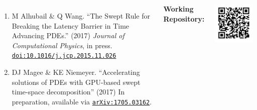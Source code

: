 \documentclass[20pt, a0paper, landscape, margin=0mm, innermargin=15mm, blockverticalspace=15mm, colspace=15mm, subcolspace=8mm]{tikzposter}
\newcommand*{\doi}[1]{\href{https://doi.org/#1}{\nolinkurl{doi:#1}}}
\begin{document}
\begin{columns}
{\begin{enumerate}[leftmargin=1cm,topsep=0pt]
        \item M Alhubail \& Q Wang.
        ``The Swept Rule for Breaking the Latency Barrier in Time Advancing PDEs.'' (2017) \textit{Journal of Computational Physics}, in press.
        \doi{10.1016/j.jcp.2015.11.026}
        
        \item DJ Magee \& KE Niemeyer.
        ``Accelerating solutions of PDEs with GPU-based swept time-space decomposition'' (2017) In preparation, available via {\tt \href{https://arxiv.org/abs/1705.03162}{arXiv:1705.03162}}.
		
    \end{enumerate}
    
    \vspace{1em}
    
    \textbf{Working Repository:}
    
   	\centering\includegraphics[width=0.45\linewidth]{repoQR}

	\vspace{0.75em}

    }
   

\end{columns}
\end{document}

